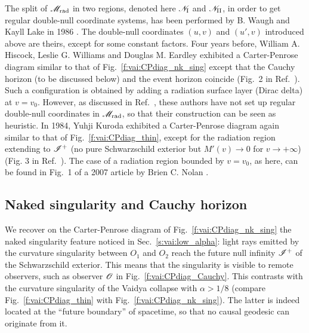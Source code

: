 \begin{hist}
The split of $\mathscr{M}_{\rm rad}$ in two regions, denoted here $\mathscr{N}_{\rm I}$
and $\mathscr{N}_{\rm II}$, in order to get regular double-null coordinate
systems, has been performed by
B. Waugh and Kayll Lake in 1986 \cite{WaughL86}.
The double-null coordinates $(u,v)$ and $(u',v)$ introduced above are
theirs, except for some constant factors.
Four years before, William A. Hiscock, Leslie G. Williams and Douglas M. Eardley \cite{HiscoWE82}
exhibited a Carter-Penrose diagram similar to that of Fig.~\ref{f:vai:CPdiag_nk_sing}
except that
the Cauchy horizon (to be discussed below) and the event horizon coincide
(Fig.~2 in Ref.~\cite{HiscoWE82}). Such a configuration
is obtained by adding a radiation surface layer (Dirac delta) at $v=v_0$.
However, as discussed in Ref.~\cite{WaughL86}, these authors have not set up
regular double-null coordinates in $\mathscr{M}_{\rm rad}$, so that their construction
can be seen as heuristic. In 1984, Yuhji Kuroda \cite{Kurod84}
exhibited a Carter-Penrose diagram again similar to that of Fig.~\ref{f:vai:CPdiag_thin}, except
for the radiation region extending to $\mathscr{I}^+$ (no pure Schwarzschild exterior but
$M'(v) \to 0$ for $v\to +\infty$) (Fig. 3 in Ref.~\cite{Kurod84}). The case of a
radiation region bounded by $v = v_0$, as here, can be found in Fig.~1 of a 2007 article by
Brien C. Nolan \cite{Nolan07}.
\end{hist}


\subsection{Naked singularity and Cauchy horizon} \label{s:vai:nak_Cauchy}

We recover on the Carter-Penrose diagram of Fig.~\ref{f:vai:CPdiag_nk_sing}
the naked singularity feature noticed in Sec.~\ref{s:vai:low_alpha}:
light rays emitted by the curvature singularity
between $O_1$ and $O_2$ reach the future null infinity $\mathscr{I}^+$ of the
Schwarzschild exterior. This means that the singularity is visible to
remote observers, such as observer $\mathscr{O}$ in Fig.~\ref{f:vai:CPdiag_Cauchy}.
This contrasts with the curvature singularity of the
Vaidya collapse with $\alpha > 1/8$ (compare Fig.~\ref{f:vai:CPdiag_thin}
with Fig.~\ref{f:vai:CPdiag_nk_sing}).
The latter is indeed located at the ``future boundary'' of spacetime, so that
no causal geodesic can originate from it.

